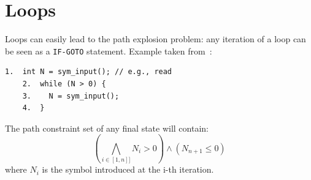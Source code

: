 




\section{Loops}
\label{se:loops}

Loops can easily lead to the path explosion problem: any iteration of a loop can be seen as a {\tt IF-GOTO} statement. Example taken from~\cite{CS-CACM13}:
    \begin{lstlisting}[basicstyle=\ttfamily\small]
    1.  int N = sym_input(); // e.g., read
    2.  while (N > 0) {
    3.    N = sym_input();  
    4.  }
    \end{lstlisting}
The path constraint set of any final state will contain:
  \[ \left ( \bigwedge_{i \in [1, n]]} N_i > 0 \right ) \wedge (N_{n+1} \leq 0) \]
where $N_i$ is the symbol introduced at the i-th iteration.\\


